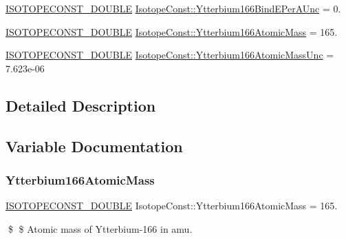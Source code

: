 \begin{DoxyCompactItemize}
\mbox{\hyperlink{group___isotope_const-_macros_ga8f45a7272ce02c0b4c65c44636ed719a}{I\+S\+O\+T\+O\+P\+E\+C\+O\+N\+S\+T\+\_\+\+D\+O\+U\+B\+LE}} \mbox{\hyperlink{group___isotope_const-_ytterbium-_yb166_ga8a90191565707d49c4b043ca4af6f466}{Isotope\+Const\+::\+Ytterbium166\+Bind\+E\+Per\+A\+Unc}} = 0.
\item 
\mbox{\hyperlink{group___isotope_const-_macros_ga8f45a7272ce02c0b4c65c44636ed719a}{I\+S\+O\+T\+O\+P\+E\+C\+O\+N\+S\+T\+\_\+\+D\+O\+U\+B\+LE}} \mbox{\hyperlink{group___isotope_const-_ytterbium-_yb166_gab4e946f20997200886555f8d32768368}{Isotope\+Const\+::\+Ytterbium166\+Atomic\+Mass}} = 165.
\item 
\mbox{\hyperlink{group___isotope_const-_macros_ga8f45a7272ce02c0b4c65c44636ed719a}{I\+S\+O\+T\+O\+P\+E\+C\+O\+N\+S\+T\+\_\+\+D\+O\+U\+B\+LE}} \mbox{\hyperlink{group___isotope_const-_ytterbium-_yb166_gab24aff1447b79720951eac278c62ec07}{Isotope\+Const\+::\+Ytterbium166\+Atomic\+Mass\+Unc}} = 7.\+623e-\/06
\end{DoxyCompactItemize}


\subsection{Detailed Description}


\subsection{Variable Documentation}
\mbox{\label{group___isotope_const-_ytterbium-_yb166_gab4e946f20997200886555f8d32768368}} 
\subsubsection{\texorpdfstring{Ytterbium166\+Atomic\+Mass}{Ytterbium166AtomicMass}}
{\footnotesize\ttfamily \mbox{\hyperlink{group___isotope_const-_macros_ga8f45a7272ce02c0b4c65c44636ed719a}{I\+S\+O\+T\+O\+P\+E\+C\+O\+N\+S\+T\+\_\+\+D\+O\+U\+B\+LE}} Isotope\+Const\+::\+Ytterbium166\+Atomic\+Mass = 165.}

\$ \$ Atomic mass of Ytterbium-\/166 in amu. \mbox{\label{group___isotope_const-_ytterbium-_yb166_gab24aff1447b79720951eac278c62ec07}} 
